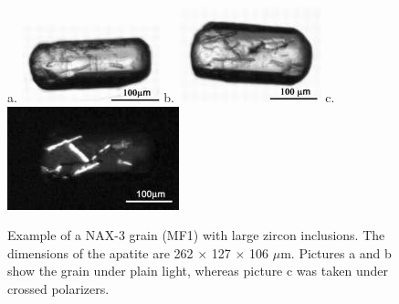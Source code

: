 \documentclass{article}
\begin{document}
\begin{figure}[htbp]
  \centering     a.     \includegraphics[width=.27\textwidth]{w1b.jpg}
b.                       \includegraphics[width=.27\textwidth]{w1a.jpg}
c. \includegraphics[width=.3\textwidth]{w1c.jpg}
  \caption{
    Example of a  NAX-3 grain (MF1) with large  zircon inclusions. The
    dimensions  of  the apatite  are  262  $\times$  127 $\times$  106
    $\mu$m. Pictures a and b show the grain under plain light, whereas
    picture c was taken under crossed polarizers.}
  \label{fig:W1}
\end{figure}
\end{document}
